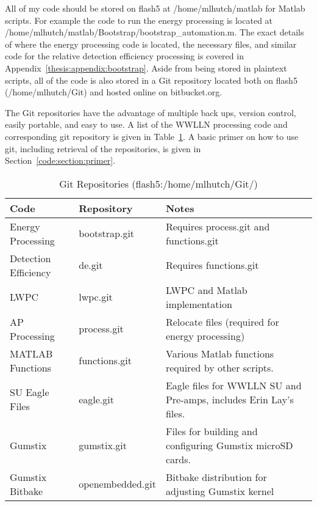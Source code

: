 All of my code should be stored on flash5 at /home/mlhutch/matlab for Matlab scripts.
For example the code to run the energy processing is located at /home/mlhutch/matlab/Bootstrap/bootstrap\_automation.m.
The exact details of where the energy processing code is located, the necessary files, and similar code for the relative detection efficiency processing is covered in Appendix~\ref{thesis:appendix:bootstrap}.
Aside from being stored in plaintext scripts, all of the code is also stored in a Git repository located both on flash5 (/home/mlhutch/Git) and hosted online on bitbucket.org.

The Git repositories have the advantage of multiple back ups, version control, easily portable, and easy to use.
A list of the WWLLN processing code and corresponding git repository is given in Table~\ref{code:table:repo}.
A basic primer on how to use git, including retrieval of the repositories, is given in Section~\ref{code:section:primer}.

\begin{table}[h!]
\caption{Git Repositories (flash5:/home/mlhutch/Git/)}
\begin{center}
\begin{tabular}{|p{1.5in}|p{1.25in}|p{3in}|}

\hline
{\bf Code} &	{\bf Repository} &	{\bf Notes}\\

\hline
\rule{0pt}{3ex}
Energy Processing	&bootstrap.git	&	Requires process.git and functions.git \\ 

\hline
\rule{0pt}{3ex}
Detection Efficiency	&de.git	&	Requires functions.git\\ 

\hline
\rule{0pt}{3ex}
LWPC	&lwpc.git	&	LWPC and Matlab implementation\\ 

\hline
\rule{0pt}{3ex}
AP Processing	&process.git	&	Relocate files (required for energy processing)\\ 

\hline
\rule{0pt}{3ex}
MATLAB Functions	&functions.git	&	Various Matlab functions required by other scripts.\\ 

\hline
\rule{0pt}{3ex}
SU Eagle Files	&eagle.git	&	Eagle files for WWLLN SU and Pre-amps, includes Erin Lay's files.\\ 

\hline
\rule{0pt}{3ex}
Gumstix	&gumstix.git	&	Files for building and configuring Gumstix microSD cards.\\ 

\hline
\rule{0pt}{3ex}
Gumstix Bitbake	&openembedded.git	&	Bitbake distribution for adjusting Gumstix kernel\\ 

\hline
\end{tabular}
\end{center}
\label{code:table:repo}
\end{table}

